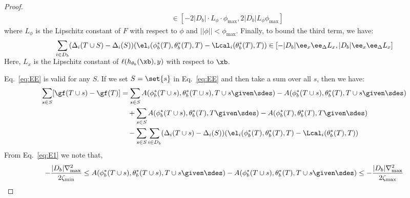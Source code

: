\begin{proof}
\begin{align}
& \in [-2 |D_b|\cdot L_{\phi} \cdot \phi_{\max},2 |D_b| L_{\phi} \phi_{\max}] \label{eq:b1}
\end{align}
where $L_{\phi}$ is the Lipschitz constant of $F$ with respect to $\phi$ and $||\phi|| < \phi_{\max}$. Finally, to bound the third term,   we have:
 \begin{align}
      \sum_{i\in D_b}(\Delta_i(T\cup S) - \Delta_i (S) ) ( \el_i(\phi_b ^*(T) , \theta_b ^*(T), T) - \Lcal_i (\theta _b ^*(T), T) ) \in [-|D_b| \ee_x \ee_\Delta L_x,|D_b| \ee_x \ee_\Delta L_x]\nonumber\\[-2ex]\label{eq:b2}
 \end{align}
 Here, $L_x$ is the Lipschitz constant of $\ell(h_{\theta_b}(\xb),y)$ with respect to $\xb$.

 Eq.~\eqref{eq:EE} is valid for any $S$. If we set $S = \set{s}$ in Eq.~\eqref{eq:EE} and then take a sum over all $s$, then we have:
 \begin{align}
  \sum_{s \in S} [\gf (T\cup s) - \gf(T)] &  = \sum_{s\in S} A(\phi^* _b (T\cup s),  \theta^* _b (T\cup s), T\cup s \given \sdes) - A(\phi^* _b (T\cup s),  \theta^* _b (T), T\cup s \given \sdes)\nonumber \\
&\quad  + \sum_{s\in S} A(\phi^* _b (T\cup s),  \theta^* _b (T), T \given \sdes)  - A(\phi^* _b (T),  \theta^* _b (T), T \given \sdes) \nonumber \\
  &\quad - \sum_{s\in S} \sum_{i\in D_b}(\Delta_i(T\cup s) - \Delta_i (S) ) ( \el_i(\phi_b ^*(T) , \theta_b ^*(T), T) - \Lcal_i (\theta _b ^*(T), T) ) \label{eq:BB-1}
\end{align}
From Eq.~\eqref{eq:E1}  we note that, 
\begin{align}
-\frac{|D_b|\nabla_{\max} ^2}{2\zeta_{\min}} \le     A(\phi^* _b (T\cup s),  \theta^* _b (T\cup s), T\cup s \given \sdes) - A(\phi^* _b (T\cup s),  \theta^* _b (T), T \cup s \given \sdes) \le -\frac{|D_b|\nabla_{\max} ^2}{2\zeta_{\max}} \label{eq:A-A-0}
\end{align}

\end{proof}
